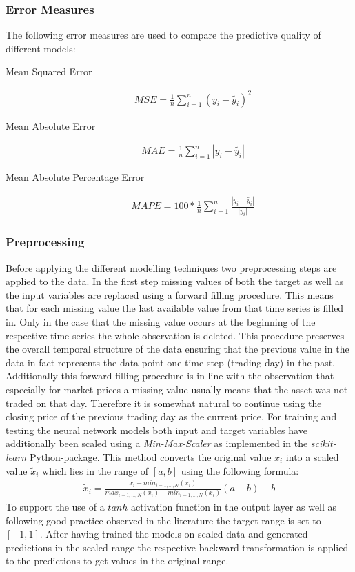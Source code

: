 \subsubsection{Error Measures}
The following error measures are used to compare the predictive quality of different models:
\begin{description}
\item[Mean Squared Error]
\begin{align*}
MSE = \frac{1}{n}\sum_{i=1}^{n}(y_i - \tilde{y_i})^2
\end{align*}
\item[Mean Absolute Error]
\begin{align*}
MAE = \frac{1}{n}\sum_{i=1}^{n}|y_i - \tilde{y_i}|
\end{align*}
\item[Mean Absolute Percentage Error]
\begin{align*}
MAPE = 100 * \frac{1}{n}\sum_{i=1}^{n}\frac{|y_i - \tilde{y_i}|}{|y_i|}
\end{align*}
\end{description}
\subsubsection{Preprocessing}
Before applying the different modelling techniques two preprocessing steps are applied to the data. In the first step missing values of both the target as well as the input variables are replaced using a forward filling procedure. This means that for each missing value the last available value from that time series is filled in. Only in the case that the missing value occurs at the beginning of the respective time series the whole observation is deleted. This procedure preserves the overall temporal structure of the data ensuring that the previous value in the data in fact represents the data point one time step (trading day) in the past. Additionally this forward filling procedure is in line with the observation that especially for market prices a missing value usually means that the asset was not traded on that day. Therefore it is somewhat natural to continue using the closing price of the previous trading day as the current price.
For training and testing the neural network models both input and target variables have additionally been scaled using a \textit{Min-Max-Scaler} as implemented in the \textit{scikit-learn} Python-package. This method converts the original value $x_i$ into a scaled value $\tilde{x}_i$ which lies in the range of $[a,b]$ using the following formula:
\begin{align*}
\tilde{x}_i = \frac{x_i - min_{i = 1,...,N}(x_i)}{max_{i = 1,...,N}(x_i) - min_{i = 1,...,N}(x_i)}(a - b) + b
\end{align*}
To support the use of a $tanh$ activation function in the output layer as well as following good practice observed in the literature the target range is set to $[-1,1]$. After having trained the models on scaled data and generated predictions in the scaled range the respective backward transformation is applied to the predictions to get values in the original range. 

